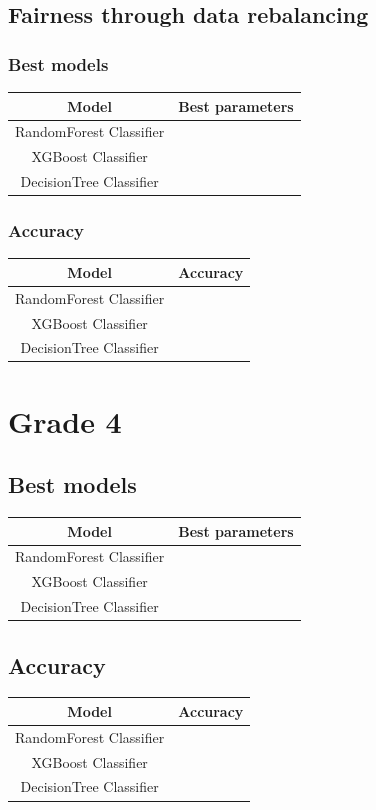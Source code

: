 \documentclass[12pt,a4paper,openright,twoside]{book}
\begin{document}
\subsection{Fairness through data rebalancing}
\subsubsection{Best models}
\begin{tabular}{|c|c|}
    \hline
    \textbf{Model} & \textbf{Best parameters} \\
    \hline
    RandomForest Classifier  &  \\
    \hline
    XGBoost Classifier & \\
    \hline
    DecisionTree Classifier &  \\
    \hline
\end{tabular}

\subsubsection{Accuracy}
\begin{tabular}{|c|c|}
    \hline
    \textbf{Model} & \textbf{Accuracy} \\
    \hline
    RandomForest Classifier  &  \\
    \hline
    XGBoost Classifier & \\
    \hline
    DecisionTree Classifier &  \\
    \hline
\end{tabular}

\iffalse
\newpage
\section{Grade 4}
\subsection{Best models}
\begin{tabular}{|c|c|}
    \hline
    \textbf{Model} & \textbf{Best parameters} \\
    \hline
    RandomForest Classifier  &  \\
    \hline
    XGBoost Classifier & \\
    \hline
    DecisionTree Classifier &  \\
    \hline
\end{tabular}

\subsection{Accuracy}
\begin{tabular}{|c|c|}
    \hline
    \textbf{Model} & \textbf{Accuracy} \\
    \hline
    RandomForest Classifier  &  \\
    \hline
    XGBoost Classifier & \\
    \hline
    DecisionTree Classifier &  \\
    \hline
\end{tabular}
\end{document}
